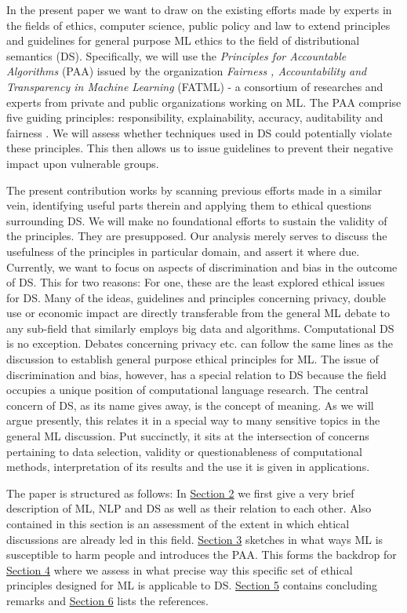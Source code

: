 \documentclass{article}
\begin{document}
In the present paper we want to draw on the existing efforts made by experts in the fields of ethics, computer science, public policy and law to extend principles  and guidelines for general purpose ML ethics to the field of distributional semantics (DS). Specifically, we will use the \emph{Principles for Accountable Algorithms} (PAA) issued by the organization \emph{Fairness , Accountability and Transparency in Machine Learning} (FATML) - a consortium of researches and experts from private and public organizations working on ML. 
The PAA comprise five guiding principles: responsibility, explainability, accuracy, auditability and fairness \cite{principles}.
We will assess whether techniques used in DS could potentially violate these principles. This then allows us to issue guidelines to prevent their negative impact upon vulnerable groups. 

The present contribution works by scanning previous efforts made in a similar vein, identifying useful parts therein and applying them to ethical questions surrounding DS. We will make no foundational efforts to sustain the validity of the principles. They are presupposed. Our analysis merely serves to discuss the usefulness of the principles in particular domain, and assert it where due.
Currently, we want to focus on aspects of discrimination and bias in the outcome of DS. This for two reasons: For one, these are the least explored ethical issues for DS. Many of the ideas, guidelines and principles concerning privacy, double use or economic impact are directly transferable from the general ML debate to any sub-field that similarly employs big data and algorithms. Computational DS is no exception. Debates concerning privacy etc. can follow the same lines as the discussion to establish general purpose ethical principles for ML. The issue of discrimination and bias, however, has a special relation to DS because the field occupies a unique position of computational language research. The central concern of DS, as its name gives away, is the concept of meaning. As we will argue presently, this relates it in a special way to many sensitive topics in the general ML discussion. Put succinctly, it sits at the intersection of concerns pertaining to data selection, validity or questionableness of computational methods, interpretation of its results and the use it is given in applications.

The paper is structured as follows: In \hyperlink{sec2}{Section 2} we first give a very brief description of ML, NLP and DS as well as their relation to each other. Also contained in this section is an assessment of the extent in which ehtical discussions are already led in this field. \hyperlink{sec3}{Section 3} sketches in what ways ML is susceptible to harm people and introduces the PAA. This forms the backdrop for \hyperlink{sec4}{Section 4} where we assess in what precise way this specific set of ethical principles designed for ML is applicable to DS. \hyperlink{sec5}{Section 5} contains concluding remarks and \hyperlink{sec6}{Section 6} lists the references.
\end{document}
